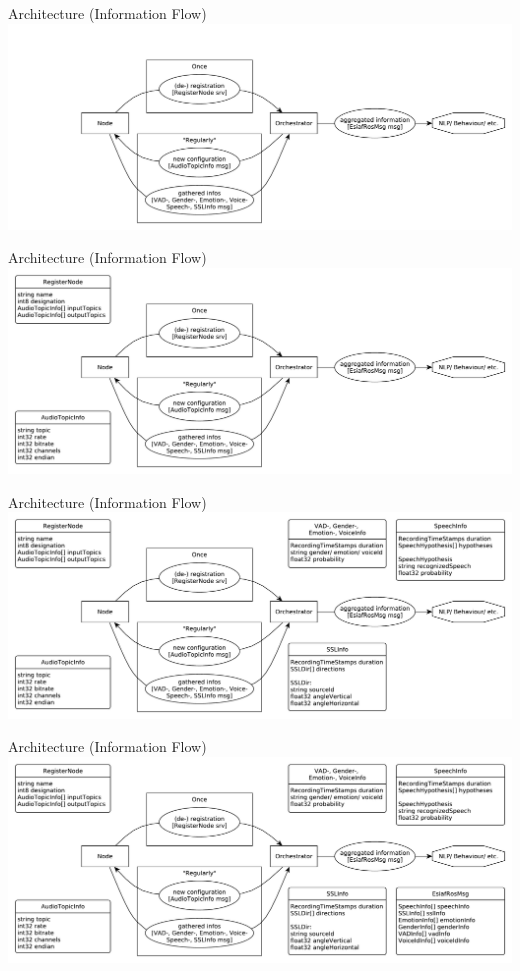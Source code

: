 \documentclass{beamer}
\begin{document}
	\begin{frame}{Architecture (Information Flow)}
		\centering
		\includegraphics[width=\textwidth]{Bilder/orchestrator_0}
	\end{frame}
	
	\begin{frame}{Architecture (Information Flow)}
		\centering
		\includegraphics[width=\textwidth]{Bilder/orchestrator_05}
	\end{frame}
	
	\begin{frame}{Architecture (Information Flow)}
		\centering
		\includegraphics[width=\textwidth]{Bilder/orchestrator_1}
	\end{frame}
	
	\begin{frame}{Architecture (Information Flow)}
		\centering
		\includegraphics[width=\textwidth]{Bilder/orchestrator_2}
	\end{frame}
	
\end{document}
